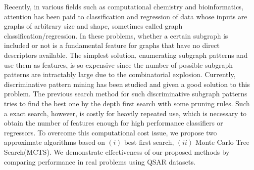 Recently, in various fields such as computational chemistry and bioinformatics,
attention has been paid to classification and regression
of data whose inputs are graphs of arbitrary size and shape, 
sometimes called graph classification/regression.
In these problems,
whether a certain subgraph is included or not 
is a fundamental feature for graphs that have no direct descriptors available.
The simplest solution, 
enumerating subgraph patterns and use them as features, is so expensive 
since the number of possible subgraph patterns are intractably large 
due to the combinatorial explosion.
Currently, discriminative pattern mining has been studied and given a good solution to this problem.
The previous search method for such discriminative subgraph patterns 
tries to find the best one by the depth first search with some pruning rules.
Such a exact search, however, is costly for heavily repeated use, 
which is necessary to obtain the number of features enough for high performance classifiers or regressors.
To overcome this computational cost issue, 
we propose two approximate algorithms based on 
$(i)$ best first search, $(ii)$ Monte Carlo Tree Search(MCTS). 
We demonstrate effectiveness of our proposed methods by comparing performance 
in real problems using QSAR datasets.
